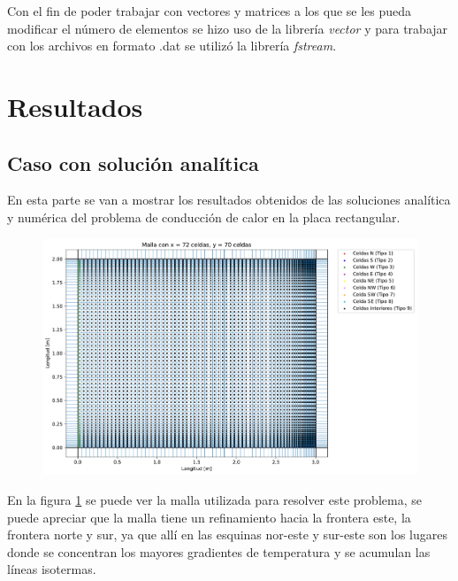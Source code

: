 \documentclass[article,latterpaper]{IEEEtran}
\begin{document}
Con el fin de poder trabajar con vectores y matrices a los que se les pueda modificar el número de elementos se hizo uso de la librería \textit{vector} y para trabajar con los archivos en formato .dat se utilizó la librería \textit{fstream}.

\vspace{8 cm}

\section{Resultados}
\subsection{Caso con solución analítica}

En esta parte se van a mostrar los resultados obtenidos de las soluciones analítica y numérica del problema de conducción de calor en la placa rectangular.

\begin{figure}[H]
    \centering
    \includegraphics[scale=0.25]{Caso_analitico/Malla.pdf}
    \caption{ }
    \label{Malla_An_num}
\end{figure}

En la figura \ref{Malla_An_num} se puede ver la malla utilizada para resolver este problema, se puede apreciar que la malla tiene un refinamiento hacia la frontera este, la frontera norte y sur, ya que allí en las esquinas nor-este y sur-este son los lugares donde se concentran los mayores gradientes de temperatura y se acumulan las líneas isotermas.
\end{document}
